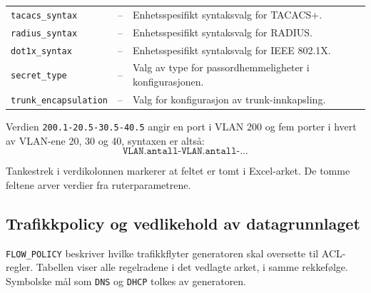 \begin{table}[H]
\begin{tabular}{
        >{\raggedright\arraybackslash}p{4.4cm}
        >{\raggedright\arraybackslash}p{4.6cm}
        >{\raggedright\arraybackslash}p{5.2cm}
    }
        \texttt{tacacs\_syntax} &
        -- &
        Enhetsspesifikt syntaksvalg for TACACS+. \\

        \texttt{radius\_syntax} &
        -- &
        Enhetsspesifikt syntaksvalg for RADIUS. \\

        \texttt{dot1x\_syntax} &
        -- &
        Enhetsspesifikt syntaksvalg for IEEE 802.1X. \\

        \texttt{secret\_type} &
        -- &
        Valg av type for passordhemmeligheter i konfigurasjonen. \\

        \texttt{trunk\_encapsulation} &
        -- &
        Valg for konfigurasjon av trunk-innkapsling. \\

        \bottomrule
    \end{tabular}
\end{table}

\noindent
Verdien \texttt{200.1-20.5-30.5-40.5} angir en port i VLAN 200
og fem porter i hvert av VLAN-ene 20, 30 og 40, syntaxen er altså:
\[
    \texttt{VLAN.antall-VLAN.antall-...}
\]

Tankestrek i verdikolonnen markerer at feltet er tomt i
Excel-arket. De tomme feltene arver verdier fra ruterparametrene.

\clearpage
\subsection*{Trafikkpolicy og vedlikehold av datagrunnlaget}

\texttt{FLOW\_POLICY} beskriver hvilke trafikkflyter generatoren skal
oversette til ACL-regler. Tabellen viser alle regelradene i det vedlagte
arket, i samme rekkefølge. Symbolske mål som \texttt{DNS} og
\texttt{DHCP} tolkes av generatoren.

